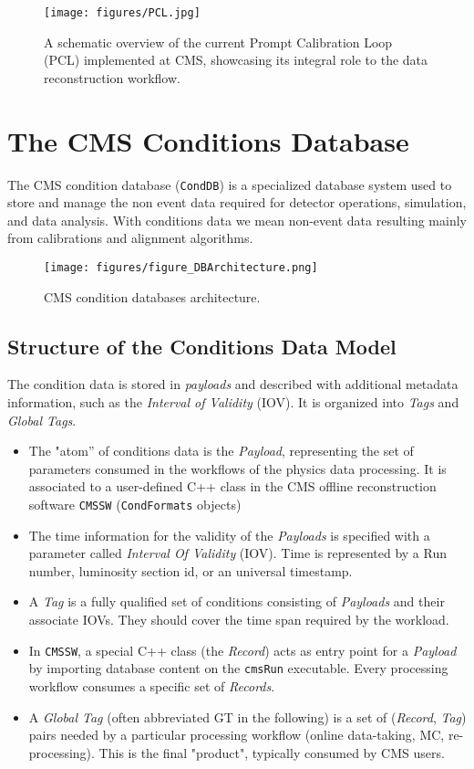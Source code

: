 \begin{figure}[h!]	
\centering
\texttt{[image: figures/PCL.jpg]} %
\caption{A schematic overview of the current Prompt Calibration Loop (PCL) implemented at CMS, showcasing its integral role to the data reconstruction workflow.} %
\label{fig:PCL}
\end{figure}

\section{The CMS Conditions Database} \label{sec:CMS_CondDB}

The CMS condition database (\texttt{CondDB}) is a specialized database system used to store and manage the non event data required for detector operations, simulation, and data analysis. With conditions data we mean non-event data resulting mainly from calibrations and alignment algorithms.

\begin{figure}[h!]	
\centering
\texttt{[image: figures/figure\_DBArchitecture.png]} %
\caption{CMS condition databases architecture. \cite{Gruttola_2010}} 
\label{fig:CondDB}
\end{figure}

\subsection{Structure of the Conditions Data Model}
The condition data is stored in \emph{payloads} and described with additional metadata information, such as the \emph{Interval of
Validity} (IOV). It is organized into \emph{Tags} and \emph{Global Tags}.
\begin{itemize}
\item The "atom” of conditions data is the \emph{Payload}, representing the set of parameters consumed in the workflows of the physics data processing. It is associated to a user-defined C++ class in the CMS offline reconstruction software \texttt{CMSSW} \cite{CMSSW_ref} (\texttt{CondFormats} objects)
\item The time information for the validity of the \emph{Payloads} is specified with a parameter called \emph{Interval Of Validity} (IOV). Time is represented by a Run number, luminosity section id, or an universal timestamp.
\item A \emph{Tag} is a fully qualified set of conditions consisting of
\emph{Payloads} and their associate IOVs. They should cover the time span required by the workload. 
\item In \texttt{CMSSW}, a special C++ class (the \emph{Record}) acts as entry point for a \emph{Payload} by importing database content on the \texttt{cmsRun} executable. Every processing workflow consumes a specific set of \emph{Records}.
\item A \emph{Global Tag} (often abbreviated GT in the following) is a set of (\emph{Record}, \emph{Tag}) pairs needed by a particular processing workflow (online data-taking, MC, re-processing). This is the final "product", typically consumed by CMS users.
\end{itemize}

